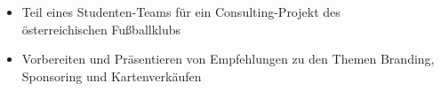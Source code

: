 \documentclass[9pt,a4paper,ragged2e]{altacv}
\begin{document}
    \divider

    \begin{itemize}
        \item Teil eines Studenten-Teams für ein Consulting-Projekt des \\ österreichischen Fußballklubs
        \item Vorbereiten und Präsentieren von Empfehlungen zu den Themen Branding, Sponsoring und Kartenverkäufen
    \end{itemize}



    \medskip

    \clearpage
\end{document}
